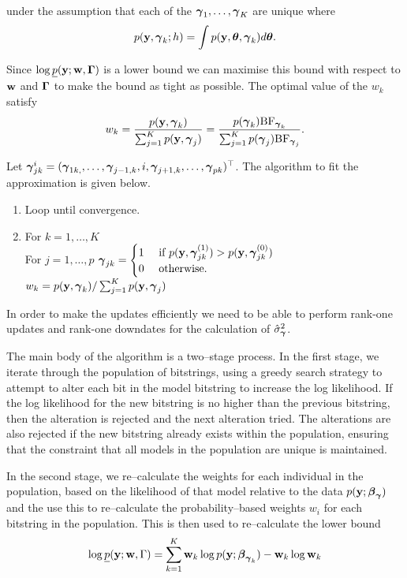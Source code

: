 \documentclass{amsart}[12pt]
\begin{document}
under the assumption that each of the ${\boldsymbol \gamma}_1, \ldots, {\boldsymbol \gamma}_K$ are unique where
\[
	p({\bf y}, {\boldsymbol \gamma}_k; h) = \int p({\bf y}, {\boldsymbol \theta}, {\boldsymbol \gamma}_k) d {\boldsymbol \theta}.
\]

Since $\log \underline{p}({\bf y}; {\bf w}, {\boldsymbol \Gamma})$ is a lower bound we can maximise this bound with respect to
${\bf w}$ and ${\boldsymbol \Gamma}$ to make the bound as tight as possible. The optimal value of the $w_k$ satisfy
\begin{align*}
	w_k = \frac{p({\bf y}, {\boldsymbol \gamma}_k)}{\sum_{j=1}^K p({\bf y}, {\boldsymbol \gamma}_j)} = \frac{p({\boldsymbol \gamma}_k) \text{BF}_{{\boldsymbol \gamma}_k}}{\sum_{j=1}^K p({\boldsymbol \gamma}_j) \text{BF}_{{\boldsymbol \gamma}_j}}.
\end{align*}

Let ${\boldsymbol \gamma}_{jk}^{i} = ({\boldsymbol \gamma}_{1k, }, \ldots, {\boldsymbol \gamma}_{j-1, k}, i, {\boldsymbol \gamma}_{j+1, k}, \ldots, {\boldsymbol \gamma}_{pk})^\top$. The algorithm to fit the approximation is given below.
\begin{enumerate}
	\item Loop until convergence.
	\item For $k = 1, \ldots, K$ \\
	For $j = 1, \ldots, p$
	${\boldsymbol \gamma}_{jk} = \begin{cases}
	1 &\text{ if } p({\bf y}, {\boldsymbol \gamma}_{jk}^{(1)}) > p({\bf y}, {\boldsymbol \gamma}_{jk}^{(0)}) \\
	0 & \text{ otherwise}.
	\end{cases}$ \\
	$w_k = p({\bf y}, {\boldsymbol \gamma}_k) / \sum_{j=1}^K p({\bf y}, {\boldsymbol \gamma}_j)$
\end{enumerate}
In order to make the updates efficiently we need to be able to perform rank-one updates and rank-one downdates for the calculation of $\hat{\sigma}_{\boldsymbol \gamma}^2$.

The main body of the algorithm is a two--stage process. In the first stage, we iterate through the population of
bitstrings, using a greedy search strategy to attempt to alter each bit in the model bitstring to increase the log likelihood. If the log likelihood for the new bitstring is no higher than the previous bitstring, then the
alteration is rejected and the next alteration tried. The alterations are also rejected if the new bitstring
already exists within the population, ensuring that the constraint that all models in the population are
unique is maintained.

In the second stage, we re--calculate the weights for each individual in the population, based on the
likelihood of that model relative to the data $p({\bf y}; {\boldsymbol \beta}_{\boldsymbol \gamma})$ and the use this to re--calculate the
probability--based weights $w_i$ for each bitstring in the population. This is then used to re--calculate the
lower bound
\[
	\log \underline{p}({\bf y}; {\bf w}, \Gamma) = \sum_{k=1}^K {\bf w}_k \log p({\bf y}; {\boldsymbol \beta}_{{\boldsymbol \gamma}_k}) - {\bf w}_k \log {\bf w}_k
\]
\end{document}
